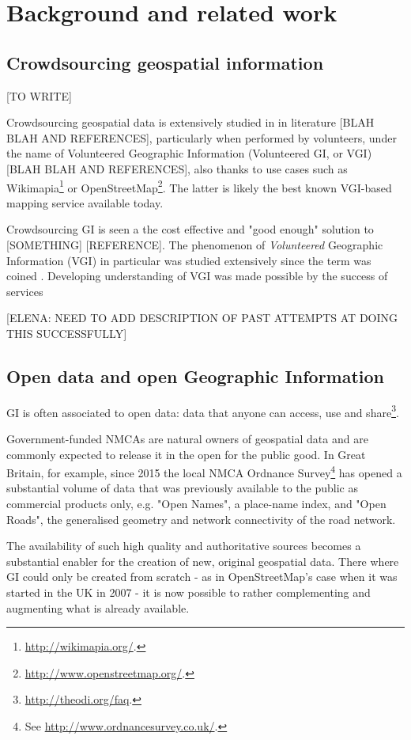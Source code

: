 \section{Background and related work}

\subsection{Crowdsourcing geospatial information}

[TO WRITE]

Crowdsourcing geospatial data is extensively studied in in literature [BLAH BLAH AND REFERENCES], particularly when performed by volunteers, under the name of Volunteered Geographic Information (Volunteered GI, or VGI) [BLAH BLAH AND REFERENCES], also thanks to use cases such as Wikimapia\footnote{\url{http://wikimapia.org/}.} or OpenStreetMap\footnote{\url{http://www.openstreetmap.org/}.}. The latter is likely the best known VGI-based mapping service available today.

Crowdsourcing GI is seen a the cost effective and "good enough" solution to [SOMETHING] [REFERENCE]. The phenomenon of {\it Volunteered} Geographic Information (VGI) in particular was studied extensively since the term was coined \cite{Goodchild:2007vt}. Developing understanding of VGI was made possible by the success of services 

[ELENA: NEED TO ADD DESCRIPTION OF PAST ATTEMPTS AT DOING THIS SUCCESSFULLY]

\subsection{Open data and open Geographic Information}

GI is often associated to open data: data that anyone can access, use and share\footnote{\url{http://theodi.org/faq}.}. 

Government-funded NMCAs are natural owners of geospatial data and are commonly expected to release it in the open for the public good. In Great Britain, for example, since 2015 the local NMCA Ordnance Survey\footnote{See \url{http://www.ordnancesurvey.co.uk/}.} has opened a substantial volume of data that was previously available to the public as commercial products only, e.g. "Open Names", a place-name index, and "Open Roads", the generalised geometry and network connectivity of the road network.
	
The availability of such high quality and authoritative sources becomes a substantial enabler for the creation of new, original geospatial data. There where GI could only be created from scratch - as in OpenStreetMap's case when it was started in the UK in 2007 - it is now possible to rather complementing and augmenting what is already available.

